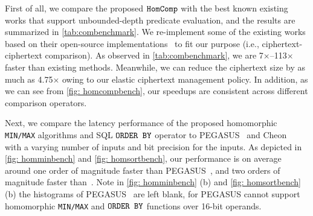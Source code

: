 First of all, we compare the proposed $\texttt{HomComp}$ with the best known 
existing works that support unbounded-depth predicate
evaluation, and the results are summarized in \cref{tab:combenchmark}.
We re-implement some of the existing works based on their open-source 
implementations~\cite{codepegasus, codesortinghat, codeopenfhe}
to fit our purpose (i.e., ciphertext-ciphertext comparison).
As observed in \cref{tab:combenchmark}, we are 7$\times$--113$\times$
faster than existing methods. Meanwhile, we can reduce the ciphertext
size by as much as 4.75$\times$ owing to our elastic ciphertext 
management policy.
In addition, as we can see from \cref{fig: homcompbench}, our
speedups are consistent across different comparison operators.



Next, we compare the latency performance of the proposed homomorphic
\texttt{MIN/MAX} algorithms and SQL $\texttt{ORDER BY}$ operator to 
PEGASUS~\cite{pegasus} and Cheon \etal~\cite{ckkscomparison}
with a varying number of inputs and bit precision for the inputs.
As depicted in \cref{fig: homminbench} and \cref{fig: homsortbench},
our performance is on average around 
one order of magnitude faster than PEGASUS~\cite{pegasus},
and two orders of magnitude faster
than~\cite{ckkscomparison}.
Note in \cref{fig: homminbench} (b) and \cref{fig: homsortbench} (b) the 
histograms of PEGASUS~\cite{pegasus}
are left blank, for PEGASUS cannot support homomorphic \texttt{MIN/MAX} 
and $\texttt{ORDER BY}$ functions
over 16-bit operands.

